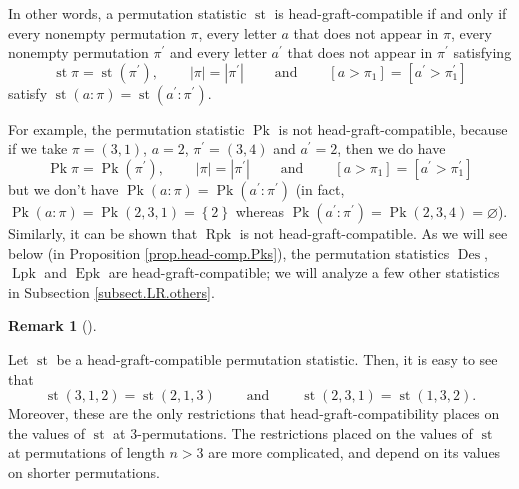 \documentclass[numbers=enddot,12pt,final,onecolumn,notitlepage]{scrartcl}%
\theoremstyle{definition}
\newtheorem{remk}[theo]{Remark}
\newenvironment{remark}[1][]
{\begin{remk}[#1]\begin{leftbar}}
{\end{leftbar}\end{remk}}
\begin{document}
In other words, a permutation statistic $\operatorname{st}$ is
head-graft-compatible if and only if every nonempty permutation $\pi$, every
letter $a$ that does not appear in $\pi$, every nonempty permutation
$\pi^{\prime}$ and every letter $a^{\prime}$ that does not appear in
$\pi^{\prime}$ satisfying%
\[
\operatorname{st} \pi   =\operatorname{st}\left(  \pi^{\prime
}\right)  ,\ \ \ \ \ \ \ \ \ \ \left\vert \pi\right\vert =\left\vert
\pi^{\prime}\right\vert \ \ \ \ \ \ \ \ \ \ \text{and}%
\ \ \ \ \ \ \ \ \ \ \left[  a>\pi_{1}\right]  =\left[  a^{\prime}>\pi
_{1}^{\prime}\right]
\]
satisfy $\operatorname{st}\left(  a:\pi\right)  =\operatorname{st}\left(
a^{\prime}:\pi^{\prime}\right)  $.

For example, the permutation statistic $\operatorname*{Pk}$ is not
head-graft-compatible, because if we take $\pi=\left(  3,1\right)  $, $a=2$,
$\pi^{\prime}=\left(  3,4\right)  $ and $a^{\prime}=2$, then we do have%
\[
\operatorname*{Pk} \pi =\operatorname*{Pk}\left(  \pi^{\prime
}\right)  ,\ \ \ \ \ \ \ \ \ \ \left\vert \pi\right\vert =\left\vert
\pi^{\prime}\right\vert \ \ \ \ \ \ \ \ \ \ \text{and}%
\ \ \ \ \ \ \ \ \ \ \left[  a>\pi_{1}\right]  =\left[  a^{\prime}>\pi
_{1}^{\prime}\right]
\]
but we don't have $\operatorname*{Pk}\left(  a:\pi\right)  =\operatorname*{Pk}%
\left(  a^{\prime}:\pi^{\prime}\right)  $ (in fact, $\operatorname*{Pk}\left(
a:\pi\right)  =\operatorname*{Pk}\left(  2,3,1\right)  =\left\{  2\right\}  $
whereas $\operatorname*{Pk}\left(  a^{\prime}:\pi^{\prime}\right)
=\operatorname*{Pk}\left(  2,3,4\right)  =\varnothing$). Similarly, it can be
shown that $\operatorname*{Rpk}$ is not head-graft-compatible. As we will see
below (in Proposition \ref{prop.head-comp.Pks}), the permutation statistics
$\operatorname{Des}$, $\operatorname*{Lpk}$ and $\operatorname{Epk}$ are
head-graft-compatible; we will analyze a few other statistics in Subsection
\ref{subsect.LR.others}.

\begin{remark}
Let $\operatorname{st}$ be a head-graft-compatible permutation statistic.
Then, it is easy to see that%
\[
\operatorname{st}\left(  3,1,2\right)  =\operatorname{st}\left(
2,1,3\right)  \ \ \ \ \ \ \ \ \ \ \text{and}%
\ \ \ \ \ \ \ \ \ \ \operatorname{st}\left(  2,3,1\right)
=\operatorname{st}\left(  1,3,2\right)  .
\]
Moreover, these are the only restrictions that head-graft-compatibility places
on the values of $\operatorname{st}$ at $3$-permutations.
The restrictions placed on the values of $\operatorname{st}$ at
permutations of length $n > 3$ are more complicated, and depend
on its values on shorter permutations.
\end{remark}
\end{document}
